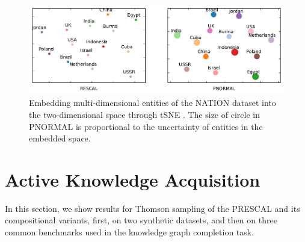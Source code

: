 \begin{figure}[t]
	\centering
	
	\includegraphics[width=0.8\linewidth]{images/embedding_nation.pdf}

	\caption{\label{fig:tsne} Embedding multi-dimensional entities of the NATION dataset into the two-dimensional space through tSNE \cite{VanDerMaaten2008}. The size of circle in PNORMAL is proportional to the uncertainty of entities in the embedded space.}
\end{figure}

\section{Active Knowledge Acquisition}
\label{sec:exp2}

In this section, we show results for Thomson sampling of the PRESCAL and its compositional variants, first, on two synthetic datasets, and then on three common benchmarks used in the knowledge graph completion task.

